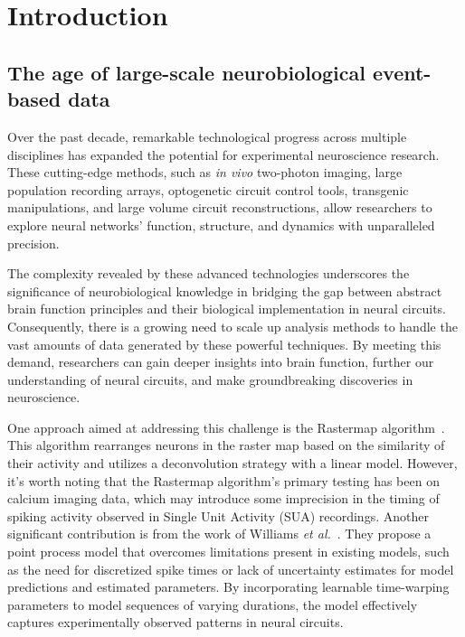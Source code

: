 \documentclass[runningheads]{llncs}
\begin{document}
\section{Introduction}

\subsection{The age of large-scale neurobiological event-based data}
% 
Over the past decade, remarkable technological progress across multiple disciplines has expanded the potential for experimental neuroscience research. These cutting-edge methods, such as \textit{in vivo} two-photon imaging, large population recording arrays, optogenetic circuit control tools, transgenic manipulations, and large volume circuit reconstructions, allow researchers to explore neural networks' function, structure, and dynamics with unparalleled precision.

The complexity revealed by these advanced technologies underscores the significance of neurobiological knowledge in bridging the gap between abstract brain function principles and their biological implementation in neural circuits. Consequently, there is a growing need to scale up analysis methods to handle the vast amounts of data generated by these powerful techniques. By meeting this demand, researchers can gain deeper insights into brain function, further our understanding of neural circuits, and make groundbreaking discoveries in neuroscience.

One approach aimed at addressing this challenge is the Rastermap algorithm~\cite{pachitariu_robustness_2018}. This algorithm rearranges neurons in the raster map based on the similarity of their activity and utilizes a deconvolution strategy with a linear model. However, it's worth noting that the Rastermap algorithm's primary testing has been on calcium imaging data, which may introduce some imprecision in the timing of spiking activity observed in Single Unit Activity (SUA) recordings. 
Another significant contribution is from the work of Williams {\it et al.}~\cite{williams_point_2020}. They propose a point process model that overcomes limitations present in existing models, such as the need for discretized spike times or lack of uncertainty estimates for model predictions and estimated parameters. By incorporating learnable time-warping parameters to model sequences of varying durations, the model effectively captures experimentally observed patterns in neural circuits. %
%
\end{document}
